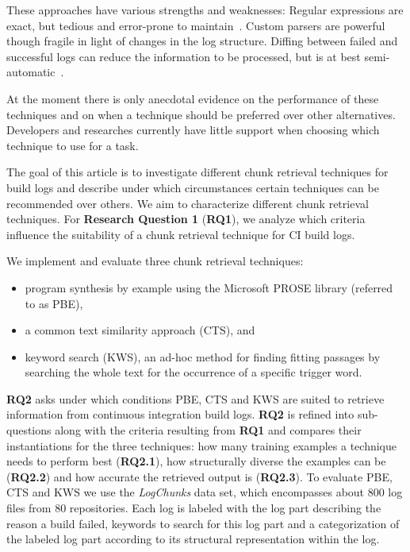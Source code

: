 These approaches have various strengths and weaknesses: Regular
expressions are exact, but tedious and error-prone to
maintain~\cite{michael2019regexes}.  Custom parsers are powerful
though fragile in light of changes in the log structure. Diffing
between failed and successful logs can reduce the information to be
processed, but is at best semi-automatic~\cite{amar2019mining}.

At the moment there is only anecdotal evidence on the performance of these techniques and on when a technique should be preferred over other alternatives.
Developers and researches currently have little support when choosing which technique to use for a task.

The goal of this article is to investigate different chunk retrieval techniques for build logs and describe under which circumstances certain techniques can be recommended over others.
We aim to characterize different chunk retrieval techniques.
For \textbf{Research Question 1} (\textbf{RQ1}), we analyze which criteria influence the suitability of a chunk retrieval technique for CI build logs.

We implement and evaluate three chunk retrieval techniques:
\begin{itemize}
  \item program synthesis by example using the Microsoft PROSE library (referred to as PBE),
  \item a common text similarity approach (CTS), and
  \item keyword search (KWS), an ad-hoc method for finding fitting passages by searching the whole text for the occurrence of a specific trigger word.
\end{itemize}

\textbf{RQ2} asks under which conditions PBE, CTS and KWS are suited to retrieve information from continuous integration build logs.
\textbf{RQ2} is refined into sub-questions along with the criteria resulting from \textbf{RQ1} and compares their instantiations for the three techniques:
how many training examples a technique needs to perform best (\textbf{RQ2.1}), how structurally diverse the examples can be (\textbf{RQ2.2}) and how accurate the retrieved output is (\textbf{RQ2.3}).
To evaluate PBE, CTS and KWS we use the \emph{LogChunks} data set, which encompasses about 800 log files from 80 repositories.
Each log is labeled with the log part describing the reason a build failed, keywords to search for this log part and a categorization of the labeled log part according to its structural representation within the log.



